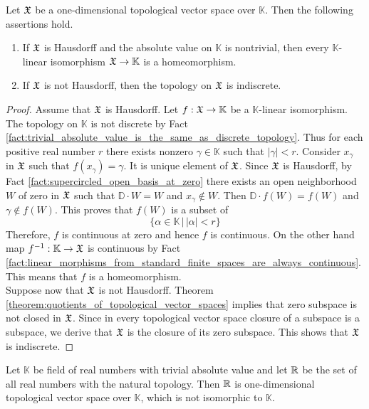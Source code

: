 \begin{theorem}\label{theorem:line_topological_spaces}
Let ${\mathfrak X}$ be a one-dimensional topological vector space over $\mathbb{K}$. Then the following assertions hold.
\begin{enumerate}[label=\emph{\textbf{(\arabic*)}}, leftmargin=*]
\item If ${\mathfrak X}$ is Hausdorff and the absolute value on $\mathbb{K}$ is nontrivial, then every $\mathbb{K}$-linear isomorphism ${\mathfrak X}\rightarrow \mathbb{K}$ is a homeomorphism.
\item If ${\mathfrak X}$ is not Hausdorff, then the topology on ${\mathfrak X}$ is indiscrete.
\end{enumerate}
\end{theorem}
\begin{proof}
Assume that ${\mathfrak X}$ is Hausdorff. Let $f:{\mathfrak X}\rightarrow \mathbb{K}$ be a $\mathbb{K}$-linear isomorphism. The topology on $\mathbb{K}$ is not discrete by Fact \ref{fact:trivial_absolute_value_is_the_same_as_discrete_topology}. Thus for each positive real number $r$ there exists nonzero $\gamma \in \mathbb{K}$ such that $|\gamma| < r$. Consider $x_{\gamma}$ in ${\mathfrak X}$ such that $f(x_{\gamma}) = \gamma$. It is unique element of ${\mathfrak X}$. Since ${\mathfrak X}$ is Hausdorff, by Fact \ref{fact:supercircled_open_basis_at_zero} there exists an open neighborhood $W$ of zero in ${\mathfrak X}$ such that $\mathbb{D}\cdot W = W$ and $x_{\gamma} \not \in W$. Then $\mathbb{D}\cdot f(W) = f(W)$ and $\gamma \not \in f(W)$.
This proves that $f(W)$ is a subset of
$$\big\{\alpha \in \mathbb{K}\,\big|\,|\alpha| < r\big\}$$
Therefore, $f$ is continuous at zero and hence $f$ is continuous. On the other hand map $f^{-1}:\mathbb{K}\rightarrow {\mathfrak X}$ is continuous by Fact \ref{fact:linear_morphisms_from_standard_finite_spaces_are_always_continuous}. This means that $f$ is a homeomorphism.\\
Suppose now that ${\mathfrak X}$ is not Hausdorff. Theorem \ref{theorem:quotients_of_topological_vector_spaces} implies that zero subspace is not closed in ${\mathfrak X}$. Since in every topological vector space closure of a subspace is a subspace, we derive that ${\mathfrak X}$ is the closure of its zero subspace. This shows that ${\mathfrak X}$ is indiscrete. 
\end{proof}

\begin{example}\label{example:one_dimensional_Hausdorff_space_nonisomorphic_to_line_for_field_with_discrete_abs_value}
Let $\mathbb{K}$ be field of real numbers with trivial absolute value and let ${\mathbb R}$ be the set of all real numbers with the natural topology.  Then ${\mathbb R}$ is one-dimensional topological vector space over $\mathbb{K}$, which is not isomorphic to $\mathbb{K}$.
\end{example}

